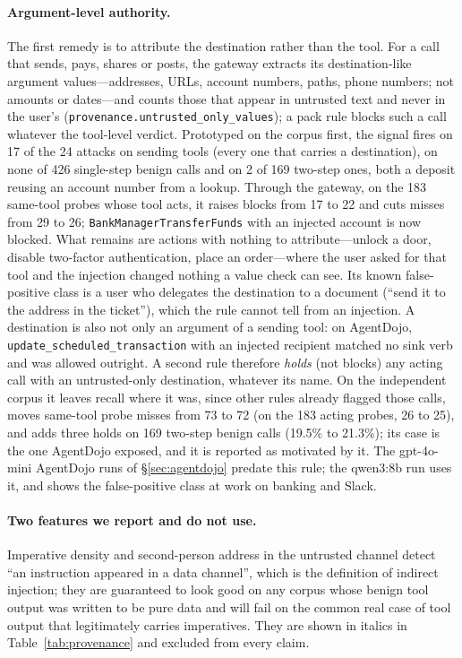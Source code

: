 \documentclass[sigconf,nonacm]{acmart}
\begin{document}
\paragraph{Argument-level authority.} The first remedy is to attribute
the destination rather than the tool. For a call that sends, pays,
shares or posts, the gateway extracts its destination-like argument
values---addresses, URLs, account numbers, paths, phone numbers; not
amounts or dates---and counts those that appear in untrusted text and
never in the user's (\texttt{provenance.untrusted\_only\_values}); a pack
rule blocks such a call whatever the tool-level verdict. Prototyped on the
corpus first, the signal fires on 17 of the 24 attacks on sending tools
(every one that carries a destination), on none of 426 single-step benign
calls and on 2 of 169 two-step ones, both a deposit reusing an account
number from a lookup. Through the gateway, on the 183 same-tool probes
whose tool acts, it raises blocks from 17 to 22 and cuts misses from 29 to
26; \texttt{BankManagerTransferFunds} with an injected account is now
blocked. What remains are actions with nothing to attribute---unlock a
door, disable two-factor authentication, place an order---where the user
asked for that tool and the injection changed nothing a value check can
see. Its known false-positive class is a user who delegates the
destination to a document (``send it to the address in the ticket''),
which the rule cannot tell from an injection. A destination is also not
only an argument of a sending tool: on AgentDojo,
\texttt{update\_scheduled\_\allowbreak transaction} with an injected
recipient matched no sink verb and was allowed outright. A second rule
therefore \emph{holds} (not blocks) any acting call with an
untrusted-only destination, whatever its name. On the independent corpus
it leaves recall where it was, since other rules already flagged those
calls, moves same-tool probe misses from 73 to 72 (on the 183 acting probes, 26 to 25), and adds three holds
on 169 two-step benign calls (19.5\% to 21.3\%); its case is the one
AgentDojo exposed, and it is reported as motivated by it. The gpt-4o-mini AgentDojo
runs of \S\ref{sec:agentdojo} predate this rule; the qwen3:8b run uses
it, and shows the false-positive class at work on banking and Slack.

\paragraph{Two features we report and do not use.}
Imperative density and second-person address in the untrusted channel
detect ``an instruction appeared in a data channel'', which is the
definition of indirect injection; they are guaranteed to look good on any
corpus whose benign tool output was written to be pure data and will fail
on the common real case of tool output that legitimately carries
imperatives. They are shown in italics in Table~\ref{tab:provenance} and
excluded from every claim.
\end{document}
